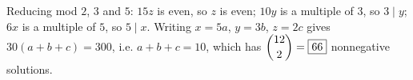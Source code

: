 Reducing mod $2$, $3$ and $5$: $15z$ is even, so $z$ is even; $10y$ is a multiple of $3$, so $3\mid y$; $6x$ is a multiple of $5$, so $5\mid x$. Writing $x=5a$, $y=3b$, $z=2c$ gives $30(a+b+c)=300$, i.e. $a+b+c=10$, which has $\dbinom{12}2=\boxed{66}$ nonnegative solutions.
